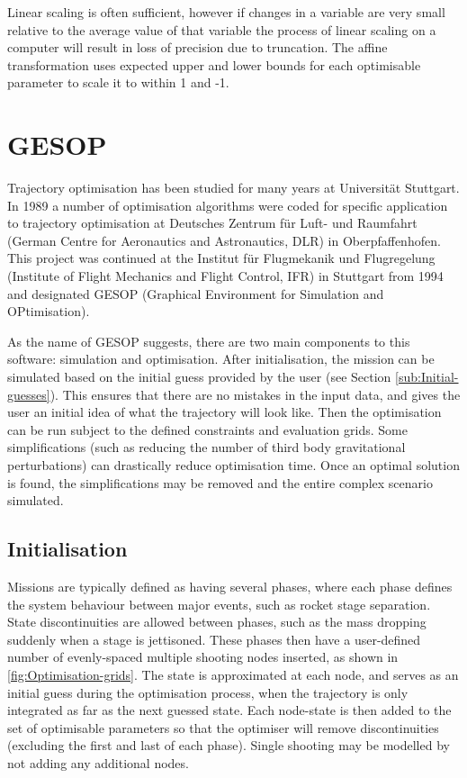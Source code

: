 Linear scaling is often sufficient, however if changes in a variable are very small relative to the average value of that variable the process of linear scaling on a computer will result in loss of precision due to truncation. The affine transformation \parencite{ASTOS_guide} uses expected upper and lower bounds for each optimisable parameter to scale it to within 1 and -1.

\section{GESOP} \label{sec:GESOP}

Trajectory optimisation has been studied for many years at Universit\"{a}t Stuttgart. In 1989 a number of optimisation algorithms were coded for specific application to trajectory optimisation at Deutsches Zentrum f\"{u}r Luft- und Raumfahrt (German Centre for Aeronautics and Astronautics, DLR) in Oberpfaffenhofen. This project was continued at the Institut f\"{u}r Flugmekanik und Flugregelung (Institute of Flight Mechanics and Flight Control, IFR) in Stuttgart from 1994 and designated GESOP (Graphical Environment for Simulation and OPtimisation).
 
As the name of GESOP suggests, there are two main components to this software: simulation and optimisation. After initialisation, the mission can be simulated based on the initial guess provided by the user (see Section \ref{sub:Initial-guesses}). This ensures that there are no mistakes in the input data, and gives the user an initial idea of what the trajectory will look like. Then the optimisation can be run subject to the defined constraints and evaluation grids. Some simplifications (such as reducing the number of third body gravitational perturbations) can drastically reduce optimisation time. Once an optimal solution is found, the simplifications may be removed and the entire complex scenario simulated.



\subsection{Initialisation} \label{sub:GESOP-Initialisation}

Missions are typically defined as having several phases, where each phase defines the system behaviour between major events, such as rocket stage separation. State discontinuities are allowed between phases, such as the mass dropping suddenly when a stage is jettisoned. These phases then have a user-defined number of evenly-spaced multiple shooting nodes inserted, as shown in \autoref{fig:Optimisation-grids}. The state is approximated at each node, and serves as an initial guess during the optimisation process, when the trajectory is only integrated as far as the next guessed state. Each node-state is then added to the set of optimisable parameters so that the optimiser will remove discontinuities (excluding the first and last of each phase). Single shooting may be modelled by not adding any additional nodes.

